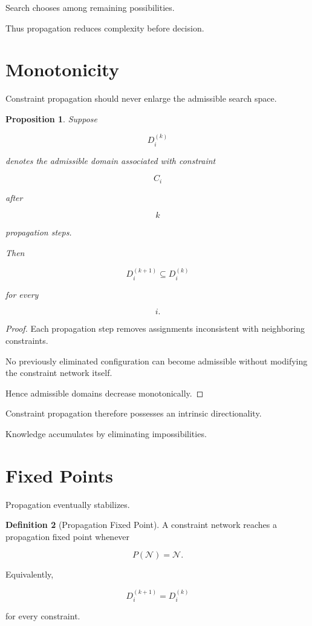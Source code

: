 \documentclass[11pt,oneside]{book}
\numberwithin{equation}{chapter}
\theoremstyle{definition}
\newtheorem{definition}{Definition}[chapter]
\theoremstyle{plain}
\newtheorem{proposition}[definition]{Proposition}
\begin{document}
Search chooses among remaining possibilities.

Thus propagation reduces complexity before decision.

\section{Monotonicity}

Constraint propagation should never enlarge the admissible search space.

\begin{proposition}

Suppose

\[
D_i^{(k)}
\]

denotes the admissible domain associated with constraint

\[
C_i
\]

after

\[
k
\]

propagation steps.

Then

\[
D_i^{(k+1)}
\subseteq
D_i^{(k)}
\]

for every

\[
i.
\]

\end{proposition}

\begin{proof}

Each propagation step removes assignments inconsistent with neighboring
constraints.

No previously eliminated configuration can become admissible without
modifying the constraint network itself.

Hence admissible domains decrease monotonically.

\end{proof}

Constraint propagation therefore possesses an intrinsic directionality.

Knowledge accumulates by eliminating impossibilities.

\section{Fixed Points}

Propagation eventually stabilizes.

\begin{definition}[Propagation Fixed Point]

A constraint network reaches a propagation fixed point whenever

\[
P(\mathcal{N})
=
\mathcal{N}.
\]

Equivalently,

\[
D_i^{(k+1)}
=
D_i^{(k)}
\]

for every constraint.

\end{definition}
\end{document}
